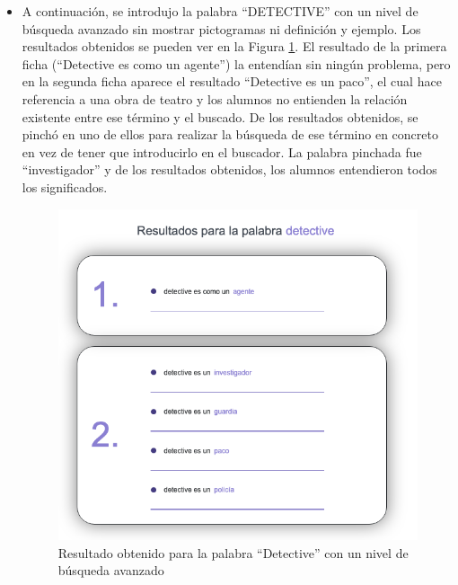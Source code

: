 \begin{itemize}
	\item A continuación, se introdujo la palabra  ``DETECTIVE'' con un nivel de búsqueda avanzado sin mostrar pictogramas ni definición y ejemplo. Los resultados obtenidos se pueden ver en la Figura \ref{fig:detectiveAvanzado}. El resultado de la primera ficha (``Detective es como un agente'') la entendían sin ningún problema, pero en la segunda ficha aparece el resultado ``Detective es un paco'', el cual hace referencia a una obra de teatro y los alumnos no entienden la relación existente entre ese término y el buscado.
	De los resultados obtenidos, se pinchó en uno de ellos para realizar la búsqueda de ese término en concreto en vez de tener que introducirlo en el buscador. La palabra pinchada fue ``investigador'' y de los resultados obtenidos, los alumnos entendieron todos los significados.
	\begin{figure}[!h]
		\includegraphics[width=.7\textwidth]{Imagenes/Bitmap/Capitulo4/EvaluacionFinal/4detectiveavanzado.png}
		\centering
		\caption{Resultado obtenido para la palabra ``Detective'' con un nivel de búsqueda avanzado}
		\label{fig:detectiveAvanzado}
	\end{figure}
	

\end{itemize}
